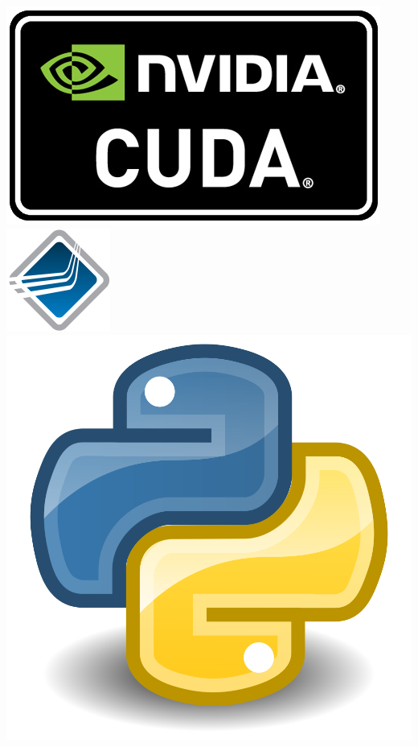 \documentclass[17pt,hyperref={pdfpagelabels=false}]{beamer}
\newlength{\onecolumnwidth}
\begin{document}
\begin{frame}[t]
\begin{columns}[t,onlytextwidth=\textwidth]
\begin{column}{0.99\paperwidth}
\begin{columns}[t,onlytextwidth=\textwidth]
\begin{column}[t,onlytextwidth=\textwidth]{\onecolumnwidth}
            \includegraphics[scale=0.5]{nvidia-cuda2.png}\hspace{1cm}
            \includegraphics[scale=1.0]{open-mpi-logo.png}\hspace{1cm}
            \includegraphics[scale=0.2]{python.png}
        \end{column}
        \end{columns}
    \end{column}
\end{columns}
\end{frame}
\end{document}
